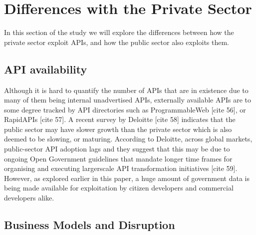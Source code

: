 \chapter{Differences with the Private Sector}

\ifpdf
    \graphicspath{{Chapter3/Figs/Raster/}{Chapter3/Figs/PDF/}{Chapter3/Figs/}}
\else
    \graphicspath{{Chapter3/Figs/Vector/}{Chapter3/Figs/}}
\fi

In this section of the study we will explore the differences between how the
private sector exploit APIs, and how the public sector also exploits them.

\section{API availability}

Although it is hard to quantify the number of APIs that are in existence
due to many of them being internal unadvertised APIs, externally available
APIs are to some degree tracked by API directories such as ProgrammableWeb
[cite 56], or RapidAPIs [cite 57]. A recent survey by Deloitte [cite 58]
indicates that the public sector may have slower growth than the private
sector which is also deemed to be slowing, or maturing. According to
Deloitte, across global markets, public-sector API adoption lags and they
suggest that this may be due to ongoing Open Government guidelines that
mandate longer time frames for organising and executing largerscale API
transformation initiatives [cite 59]. However, as explored earlier in this
paper, a huge amount of government data is being made available for
exploitation by citizen developers and commercial developers alike.

\section{Business Models and Disruption}


